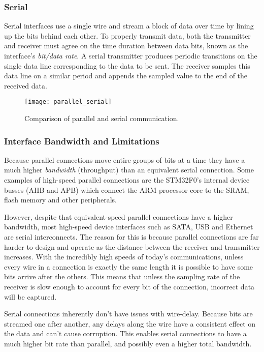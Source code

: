 \documentclass[11pt,fleqn]{book} %
\begin{document}
\subsubsection{Serial}
Serial interfaces use a single wire and stream a block of data over time by lining up the bits behind each other. To properly transmit data, both the transmitter and receiver must agree on the time duration between data bits, known as the interface's \textit{bit/data rate}. A serial transmitter produces periodic transitions on the single data line corresponding to the data to be sent. The receiver samples this data line on a similar period and appends the sampled value to the end of the received data. 

\begin{figure}[]
    \centering\texttt{[image: parallel\_serial]}
    \caption{Comparison of parallel and serial communication.}
    \label{parallel_serial}
\end{figure}

\subsubsection{Interface Bandwidth and Limitations}
Because parallel connections move entire groups of bits at a time they have a much higher \textit{bandwidth} (throughput) than an equivalent serial connection. Some examples of high-speed parallel connections are the STM32F0's internal device busses (AHB and APB) which connect the ARM processor core to the SRAM, flash memory and other peripherals.

However, despite that equivalent-speed parallel connections have a higher bandwidth, most high-speed device interfaces such as SATA, USB and Ethernet are serial interconnects. The reason for this is because parallel connections are far harder to design and operate as the distance between the receiver and transmitter increases. With the incredibly high speeds of today's communications, unless every wire in a connection is exactly the same length it is possible to have some bits arrive after the others. This means that unless the sampling rate of the receiver is slow enough to account for every bit of the connection, incorrect data will be captured.

Serial connections inherently don't have issues with wire-delay. Because bits are streamed one after another, any delays along the wire have a consistent effect on the data and can't cause corruption. This enables serial connections to have a much higher bit rate than parallel, and possibly even a higher total bandwidth.
\end{document}
